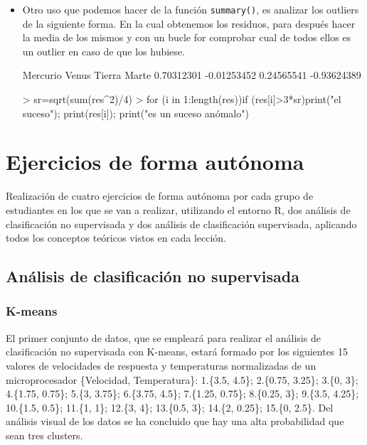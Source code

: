 \documentclass[a4paper, 12pt]{article}
\begin{document}
\begin{itemize}
    	  \item Otro uso que podemos hacer de la función \texttt{summary()}, es analizar los outliers de la siguiente forma. En la cual obtenemos los residuos, para después hacer la media de los mismos y con un bucle for comprobar cual de todos ellos es un outlier en caso de que los hubiese.
\begin{Schunk}
\begin{Soutput}
   Mercurio       Venus      Tierra       Marte 
 0.70312301 -0.01253452  0.24565541 -0.93624389 
\end{Soutput}
\begin{Sinput}
> sr=sqrt(sum(res^2)/4)
> for (i in 1:length(res)){if (res[i]>3*sr){print("el suceso"); print(res[i]); print("es un suceso anómalo")}}
\end{Sinput}
\end{Schunk}
  	\end{itemize}
	
	\newpage
	
	\section{Ejercicios de forma autónoma}
	
	Realización de cuatro ejercicios de forma autónoma por cada grupo de estudiantes en los que se van a realizar, utilizando el entorno R, dos análisis de clasificación no supervisada y dos análisis de clasificación supervisada, aplicando todos los conceptos teóricos vistos en cada lección.
	
	\subsection{Análisis de clasificación no supervisada}
	
	\subsubsection{K-means}
	
	El primer conjunto de datos, que se empleará para realizar el análisis de clasificación no supervisada con K-means, estará formado por los siguientes 15 valores de velocidades de respuesta y temperaturas normalizadas de un microprocesador \{Velocidad, Temperatura\}: 1.\{3.5, 4.5\}; 2.\{0.75, 3.25\}; 3.\{0, 3\}; 4.\{1.75, 0.75\}; 5.\{3, 3.75\}; 6.\{3.75, 4.5\}; 7.\{1.25, 0.75\}; 8.\{0.25, 3\}; 9.\{3.5, 4.25\}; 10.\{1.5, 0.5\}; 11.\{1, 1\}; 12.\{3, 4\}; 13.\{0.5, 3\}; 14.\{2, 0.25\}; 15.\{0, 2.5\}. Del análisis visual de los datos se ha concluido que hay una alta probabilidad que sean tres clusters.
	
\end{document}
